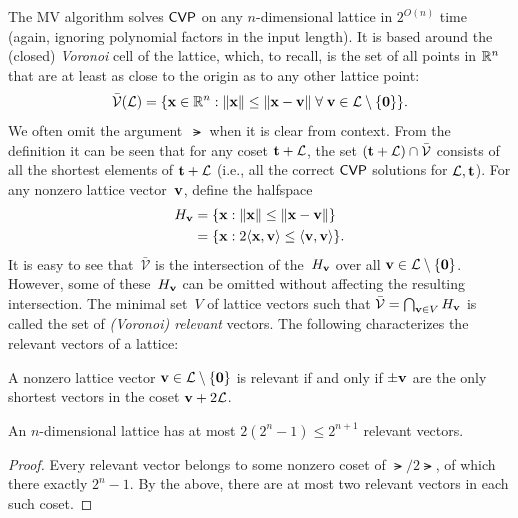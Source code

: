 \documentclass[11pt]{article}
\begin{document}
\newcommand{\Vbar}{\ensuremath{\bar{\mathcal{V}}}}

The MV algorithm solves $\mathsf{CVP}$ on any $n$-dimensional lattice in $2^{O(n)}$ time (again, ignoring polynomial factors in the input length).
It is based around the (closed) \emph{Voronoi} cell of the lattice, which, to recall, is the set of all points in $\mathbb{R}^{n}$ that are at least as close to the origin as to any other lattice point:
\begin{equation}
  \label{eq:voronoi}
  \Vbar(\lat) = \set{\vecx \in \R^n : \length{\vecx} \leq
    \length{\vecx - \vecv} \; \forall\;
    \vecv \in \lat \setminus \set{\veczero} }.
\end{equation}
We often omit the argument~$\lat$ when it is clear from context.
From the definition it can be seen that for any coset $\mathbf{t}+\mathcal{L}$, the set $(\vect+\lat) \cap \Vbar$ consists of all the shortest elements of $\mathbf{t}+\mathcal{L}$ (i.e., all the correct $\mathsf{CVP}$ solutions for $\mathcal{L},\mathbf{t}$).
For any nonzero lattice vector~$\mathbf{v}$, define the halfspace
\begin{align}
  \label{eq:Hv}
  H_{\mathbf{v}}
  &= \{ \mathbf{x} : \lVert\mathbf{x}\rVert \leq \lVert\mathbf{x}-\mathbf{v}\rVert\} \\
  &= \{\mathbf{x} : 2\langle\mathbf{x}, \mathbf{v}\rangle \leq \langle\mathbf{v}, \mathbf{v}\rangle\}.
\end{align}
It is easy to see that~$\Vbar$ is the intersection of the~$H_{\mathbf{v}}$ over all $\mathbf{v} \in \mathcal{L} \setminus \{\mathbf{0}\}$.
However, some of these~$H_{\mathbf{v}}$ can be omitted without affecting the resulting intersection.
The minimal set~$V$ of lattice vectors such that $\Vbar = \bigcap_{\vecv \in V} H_{\vecv}$ is called the set of \emph{(Voronoi) relevant} vectors.
The following characterizes the relevant vectors of a lattice:

\begin{fact}[Voronoi]%
  \label{fact:voronoi}
  A nonzero lattice vector $\mathbf{v} \in \mathcal{L} \setminus \{\mathbf{0}\}$ is relevant if and only if $\pm \mathbf{v}$ are the only shortest vectors in the coset $\mathbf{v} + 2\mathcal{L}$.
\end{fact}

\begin{corollary}
  An $n$-dimensional lattice has at most $2(2^{n}-1) \leq 2^{n+1}$ relevant vectors.
\end{corollary}

\begin{proof}
  Every relevant vector belongs to some nonzero coset of $\lat/2\lat$, of which there exactly $2^{n}-1$.
  By the above, there are at most two relevant vectors in each such coset.
\end{proof}
\end{document}
